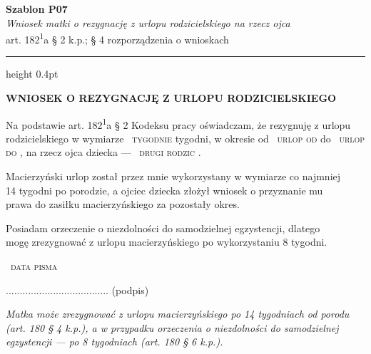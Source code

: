 \documentclass[11pt,a4paper]{article}
\newcommand{\Pole}[1]{%
  \textcolor{szary}{\dotfill}\,%
  {\scriptsize\textcolor{szary}{\textsc{#1}}}%
}
\newenvironment{warunek}[1]{%
  \par\smallskip\noindent\begin{minipage}{\linewidth}%
  \color{black}%
}{%
  \end{minipage}\par\smallskip%
}
\newcommand{\NaglowekPisma}[1]{%
  \par\vspace{0.8em}%
  \begin{center}%
    {\large\bfseries\MakeUppercase{#1}}%
  \end{center}%
  \vspace{0.4em}%
}
\begin{document}
\begin{flushright}
{\footnotesize\color{szary}
\textbf{Szablon P07}\\
{\itshape Wniosek matki o rezygnację z urlopu rodzicielskiego na rzecz ojca}\\
art. 182\textsuperscript{1}a \S{} 2 k.p.; \S{} 4 rozporządzenia o wnioskach}\
\end{flushright}

\vspace{0.5em}
{\color{ramka}\hrule height 0.4pt}
\vspace{0.8em}

\NaglowekPisma{WNIOSEK O REZYGNACJĘ Z URLOPU RODZICIELSKIEGO}

Na podstawie art. 182\textsuperscript{1}a \S{} 2 Kodeksu pracy oświadczam, że rezygnuję z urlopu
rodzicielskiego w wymiarze \Pole{tygodnie} tygodni, w okresie od \Pole{urlop od} do \Pole{urlop do},
na rzecz ojca dziecka --- \Pole{drugi rodzic}.

\begin{warunek}{jesli_po_14_tyg}
Macierzyński urlop został przez mnie wykorzystany w wymiarze co najmniej\\[-2pt]
14 tygodni po porodzie, a ojciec dziecka złożył wniosek o przyznanie mu\\[-2pt]
prawa do zasiłku macierzyńskiego za pozostały okres.
\end{warunek}

\begin{warunek}{jesli_po_8_tyg}
Posiadam orzeczenie o niezdolności do samodzielnej egzystencji, dlatego\\[-2pt]
mogę zrezygnować z urlopu macierzyńskiego po wykorzystaniu 8 tygodni.
\end{warunek}

\Pole{data pisma}
.....................................
(podpis)

\vfill
{\footnotesize\textcolor{szary}\itshape Matka może zrezygnować z urlopu macierzyńskiego po 14 tygodniach od porodu (art. 180 \S{} 4 k.p.), a w przypadku orzeczenia o niezdolności do samodzielnej egzystencji --- po 8 tygodniach (art. 180 \S{} 6 k.p.). }
\end{document}
